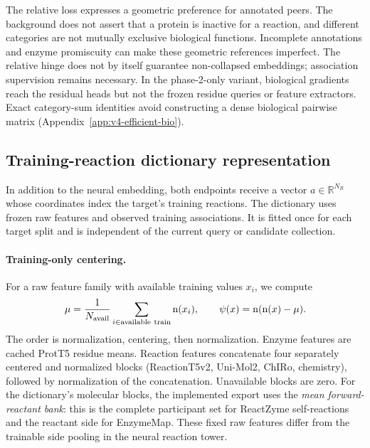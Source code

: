 The relative loss expresses a geometric preference for annotated peers. The
background does not assert that a protein is inactive for a reaction, and
different categories are not mutually exclusive biological functions.
Incomplete annotations and enzyme promiscuity can make these geometric
references imperfect. The relative hinge does not by itself guarantee
non-collapsed embeddings; association supervision remains necessary. In the
phase-2-only variant, biological gradients reach the residual heads but not
the frozen residue queries or feature extractors. Exact category-sum
identities avoid constructing a dense biological pairwise matrix
(Appendix~\ref{app:v4-efficient-bio}).

\subsection{Training-reaction dictionary representation}
\label{sec:v4-dictionary}
In addition to the neural embedding, both endpoints receive a vector
$a\in\mathbb{R}^{N_R}$ whose coordinates index the target's training
reactions. The dictionary uses frozen raw features and observed training
associations. It is fitted once for each target split and is independent of
the current query or candidate collection.

\paragraph{Training-only centering.}
For a raw feature family with available training values $x_i$, we compute
\begin{equation}
  \mu=\frac{1}{N_{\mathrm{avail}}}\sum_{i\in\mathrm{available\ train}}\vunit{x_i},
  \qquad \psi(x)=\vunit{\vunit{x}-\mu}.
  \label{eq:v4-center}
\end{equation}
The order is normalization, centering, then normalization. Enzyme features
are cached ProtT5 residue means. Reaction features concatenate four separately
centered and normalized blocks (ReactionT5v2, Uni-Mol2, ChIRo, chemistry),
followed by normalization of the concatenation. Unavailable blocks are zero.
For the dictionary's molecular blocks, the implemented export uses the
\emph{mean forward-reactant bank}: this is the complete participant set for
ReactZyme self-reactions and the reactant side for EnzymeMap. These fixed raw
features differ from the trainable side pooling in the neural reaction tower.

